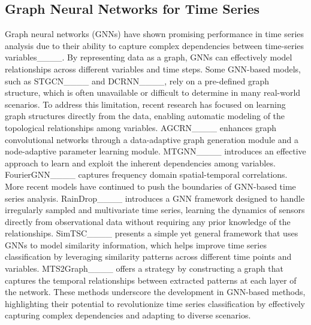 \vspace{-2.5mm}
\subsection{Graph Neural Networks for Time Series}
Graph neural networks (GNNs) have shown promising performance in time series analysis due to their ability to capture complex dependencies between time-series variables____. By representing data as a graph, GNNs can effectively model relationships across different variables and time steps. %
Some GNN-based models, such as STGCN____ and DCRNN____, rely on a pre-defined graph structure, which is often unavailable or difficult to determine in many real-world scenarios. To address this limitation, recent research has focused on learning graph structures directly from the data, enabling automatic modeling of the topological relationships among variables. AGCRN____ enhances graph convolutional networks through a data-adaptive graph generation module and a node-adaptive parameter learning module. MTGNN____ introduces an effective approach to learn and exploit the inherent dependencies among variables. FourierGNN____ captures frequency domain spatial-temporal correlations.
More recent models have continued to push the boundaries of GNN-based time series analysis. RainDrop____ introduces a GNN framework designed to handle irregularly sampled and multivariate time series, learning the dynamics of sensors directly from observational data without requiring any prior knowledge of the relationships. SimTSC____ presents a simple yet general framework that uses GNNs to model similarity information, which helps improve time series classification by leveraging similarity patterns across different time points and variables. MTS2Graph____ offers a strategy by constructing a graph that captures the temporal relationships between extracted patterns at each layer of the network. 
These methods underscore the development in GNN-based methods, highlighting their potential to revolutionize time series classification by effectively capturing complex dependencies and adapting to diverse scenarios.


